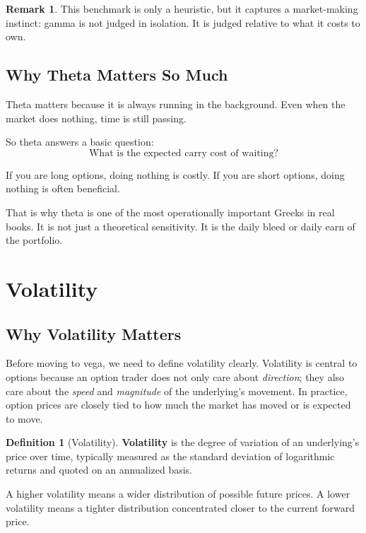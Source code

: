 \documentclass[11pt]{article}
\theoremstyle{definition}
\newtheorem{definition}{Definition}[section]
\newtheorem{remark}{Remark}[section]
\begin{document}
\begin{remark}
This benchmark is only a heuristic, but it captures a market-making instinct: gamma is not judged in isolation. It is judged relative to what it costs to own.
\end{remark}

\subsection{Why Theta Matters So Much}

Theta matters because it is always running in the background. Even when the market does nothing, time is still passing.

So theta answers a basic question:
\[
\text{What is the expected carry cost of waiting?}
\]

If you are long options, doing nothing is costly. If you are short options, doing nothing is often beneficial.

That is why theta is one of the most operationally important Greeks in real books. It is not just a theoretical sensitivity. It is the daily bleed or daily earn of the portfolio.

\section{Volatility}

\subsection{Why Volatility Matters}

Before moving to vega, we need to define volatility clearly. Volatility is central to options because an option trader does not only care about \emph{direction}; they also care about the \emph{speed} and \emph{magnitude} of the underlying's movement. In practice, option prices are closely tied to how much the market has moved or is expected to move. 

\begin{definition}[Volatility]
\textbf{Volatility} is the degree of variation of an underlying's price over time, typically measured as the standard deviation of logarithmic returns and quoted on an annualized basis.
\end{definition}

A higher volatility means a wider distribution of possible future prices. A lower volatility means a tighter distribution concentrated closer to the current forward price.
\end{document}
